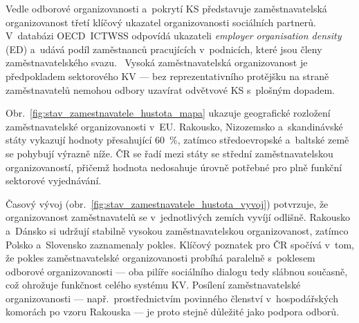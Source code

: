 
Vedle odborové organizovanosti a~pokrytí \ac{KS} představuje zaměstnavatelská organizovanost třetí klíčový ukazatel organizovanosti sociálních partnerů. V~databázi \ac{OECD}~\ac{ICTWSS} odpovídá ukazateli \emph{employer organisation density} (ED) a~udává podíl zaměstnanců pracujících v~podnicích, které jsou členy zaměstnavatelského svazu.~\cite{oecd_aias_ictwss_ED_pct}
Vysoká zaměstnavatelská organizovanost je předpokladem sektorového \ac{KV} --- bez reprezentativního protějšku na straně zaměstnavatelů nemohou odbory uzavírat odvětvové \ac{KS} s~plošným dopadem.

Obr.~\ref{fig:stav_zamestnavatele_hustota_mapa} ukazuje geografické rozložení zaměstnavatelské organizovanosti v~\ac{EU}.
Rakousko, Nizozemsko a~skandinávské státy vykazují hodnoty přesahující \SI{60}{\percent}, zatímco středoevropské a~baltské země se pohybují výrazně níže.
ČR se řadí mezi státy se střední zaměstnavatelskou organizovaností, přičemž hodnota nedosahuje úrovně potřebné pro plně funkční sektorové vyjednávání.



Časový vývoj (obr.~\ref{fig:stav_zamestnavatele_hustota_vyvoj}) potvrzuje, že organizovanost zaměstnavatelů se v~jednotlivých zemích vyvíjí odlišně.
Rakousko a~Dánsko si udržují stabilně vysokou zaměstnavatelskou organizovanost, zatímco Polsko a~Slovensko zaznamenaly pokles.
Klíčový poznatek pro ČR spočívá v~tom, že pokles zaměstnavatelské organizovanosti probíhá paralelně s~poklesem odborové organizovanosti --- oba pilíře sociálního dialogu tedy slábnou současně, což ohrožuje funkčnost celého systému \ac{KV}.
Posílení zaměstnavatelské organizovanosti --- např.\ prostřednictvím povinného členství v~hospodářských komorách po vzoru Rakouska --- je proto stejně důležité jako podpora odborů.


